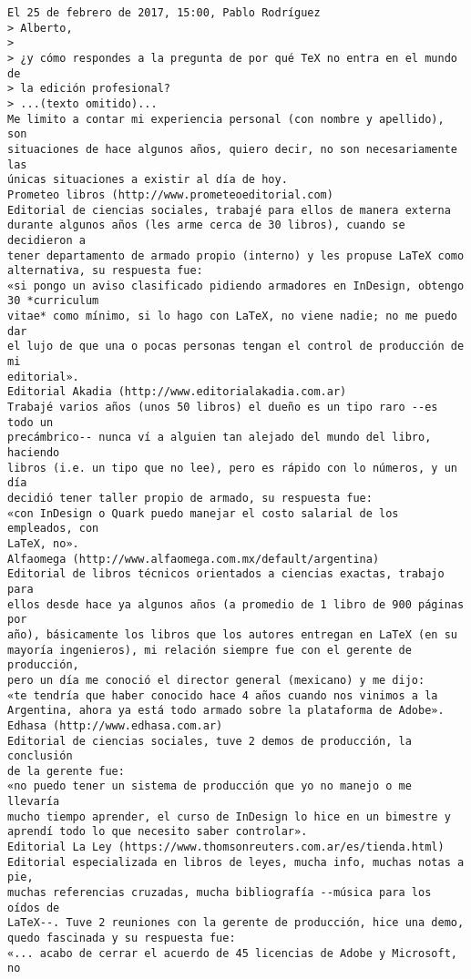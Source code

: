 \documentclass[a4paper,10pt]{article}
\begin{document}
\begin{lstlisting}
El 25 de febrero de 2017, 15:00, Pablo Rodríguez 
> Alberto,
>
> ¿y cómo respondes a la pregunta de por qué TeX no entra en el mundo de
> la edición profesional?
> ...(texto omitido)...
Me limito a contar mi experiencia personal (con nombre y apellido), son
situaciones de hace algunos años, quiero decir, no son necesariamente las
únicas situaciones a existir al día de hoy.
Prometeo libros (http://www.prometeoeditorial.com)
Editorial de ciencias sociales, trabajé para ellos de manera externa
durante algunos años (les arme cerca de 30 libros), cuando se decidieron a
tener departamento de armado propio (interno) y les propuse LaTeX como
alternativa, su respuesta fue:
«si pongo un aviso clasificado pidiendo armadores en InDesign, obtengo
30 *curriculum
vitae* como mínimo, si lo hago con LaTeX, no viene nadie; no me puedo dar
el lujo de que una o pocas personas tengan el control de producción de mi
editorial».
Editorial Akadia (http://www.editorialakadia.com.ar)
Trabajé varios años (unos 50 libros) el dueño es un tipo raro --es todo un
precámbrico-- nunca ví a alguien tan alejado del mundo del libro, haciendo
libros (i.e. un tipo que no lee), pero es rápido con lo números, y un día
decidió tener taller propio de armado, su respuesta fue:
«con InDesign o Quark puedo manejar el costo salarial de los empleados, con
LaTeX, no».
Alfaomega (http://www.alfaomega.com.mx/default/argentina)
Editorial de libros técnicos orientados a ciencias exactas, trabajo para
ellos desde hace ya algunos años (a promedio de 1 libro de 900 páginas por
año), básicamente los libros que los autores entregan en LaTeX (en su
mayoría ingenieros), mi relación siempre fue con el gerente de producción,
pero un día me conoció el director general (mexicano) y me dijo:
«te tendría que haber conocido hace 4 años cuando nos vinimos a la
Argentina, ahora ya está todo armado sobre la plataforma de Adobe».
Edhasa (http://www.edhasa.com.ar)
Editorial de ciencias sociales, tuve 2 demos de producción, la conclusión
de la gerente fue:
«no puedo tener un sistema de producción que yo no manejo o me llevaría
mucho tiempo aprender, el curso de InDesign lo hice en un bimestre y
aprendí todo lo que necesito saber controlar».
Editorial La Ley (https://www.thomsonreuters.com.ar/es/tienda.html)
Editorial especializada en libros de leyes, mucha info, muchas notas a pie,
muchas referencias cruzadas, mucha bibliografía --música para los oídos de
LaTeX--. Tuve 2 reuniones con la gerente de producción, hice una demo,
quedo fascinada y su respuesta fue:
«... acabo de cerrar el acuerdo de 45 licencias de Adobe y Microsoft, no

\end{lstlisting}
\end{document}
